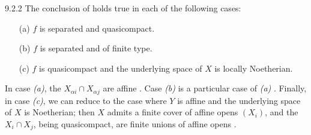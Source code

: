 \begin{env}[Corollary]{9.2.2} The conclusion of  holds true in each
of the following cases:
\begin{itemize}
\item[(a)] $f$ is separated and quasicompact.
\item[(b)] $f$ is separated and of finite type.
\item[(c)] $f$ is quasicompact and the underlying space of $X$ is locally Noetherian.
\end{itemize}
\end{env}

In case \emph{(a)}, the $X_{\alpha i}\cap X_{\alpha j}$ are affine .
Case \emph{(b)} is a particular case of \emph{(a)} .  Finally, in case
\emph{(c)}, we can reduce to the case where $Y$ is affine and the underlying
space of $X$ is Noetherian; then $X$ admits a finite cover of affine opens
$(X_i)$, and the $X_i\cap X_j$, being quasicompact, are finite unions of affine
opens .

